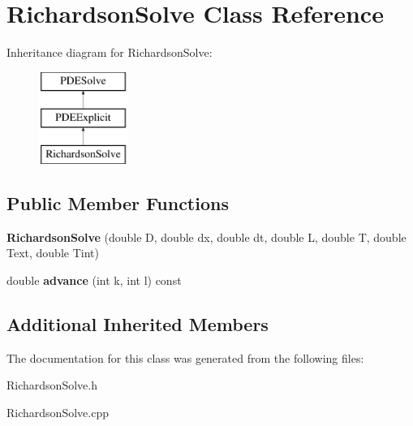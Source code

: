 \hypertarget{class_richardson_solve}{}\section{Richardson\+Solve Class Reference}
\label{class_richardson_solve}
Inheritance diagram for Richardson\+Solve\+:\begin{figure}[H]
\begin{center}
\leavevmode
\includegraphics[height=3.000000cm]{class_richardson_solve}
\end{center}
\end{figure}
\subsection*{Public Member Functions}
\begin{DoxyCompactItemize}
\item 
\mbox{\label{class_richardson_solve_a181c71a169292bdba433af2564f763b5}} 
{\bfseries Richardson\+Solve} (double D, double dx, double dt, double L, double T, double Text, double Tint)
\item 
\mbox{\label{class_richardson_solve_adaedf7448ffb94b08690ce6e878ab33c}} 
double {\bfseries advance} (int k, int l) const
\end{DoxyCompactItemize}
\subsection*{Additional Inherited Members}


The documentation for this class was generated from the following files\+:\begin{DoxyCompactItemize}
\item 
Richardson\+Solve.\+h\item 
Richardson\+Solve.\+cpp\end{DoxyCompactItemize}
